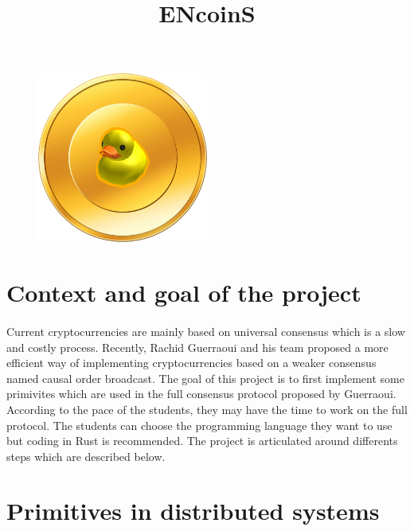 \documentclass{article}
\title{ENcoinS}
\begin{document}
\maketitle

\begin{figure}[h]
    \center
    \includegraphics[width=0.5\textwidth]{encoins.png}
\end{figure}

\bigskip
\bigskip

\tableofcontents

\newpage

\section*{Context and goal of the project}
\paragraph{}
Current cryptocurrencies are mainly based on universal consensus which is a slow and costly process. Recently, Rachid Guerraoui and his team \cite{crypto} proposed a more efficient way of implementing cryptocurrencies based on a weaker consensus named causal order broadcast. The goal of this project is to first implement some primivites which are used in the full consensus protocol proposed by Guerraoui. According to the pace of the students, they may have the time to work on the full protocol.
The students can choose the programming language they want to use but coding in Rust is recommended. The project is articulated around differents steps which are described below.



\section{Primitives in distributed systems} \label{step1}
\end{document}
